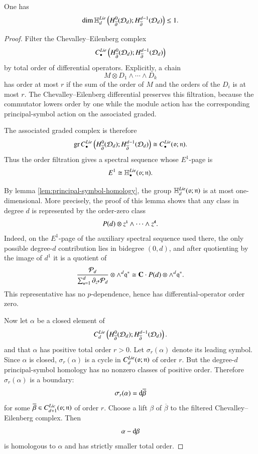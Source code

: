 \documentclass[main.tex]{subfiles}
\begin{document}
\begin{lemma}\label{lem:D-homology}
  One has
  \[
    \dim
    \mathbb H^{Lie}_d
    \left(
      H^0_{\overline{\partial}}(\mathcal D_d);
      H^{d-1}_{\overline{\partial}}(\mathcal D_d)
    \right)
    \leq 1.
  \]
\end{lemma}

\begin{proof}
Filter the Chevalley--Eilenberg complex
\[
  C^{Lie}_\bullet
  \left(
    H^0_{\overline{\partial}}(\mathcal D_d);
    H^{d-1}_{\overline{\partial}}(\mathcal D_d)
  \right)
\]
by total order of differential operators. Explicitly, a chain
\[
  M\otimes D_1\wedge\cdots\wedge D_k
\]
has order at most $r$ if the sum of the order of $M$ and the orders of the $D_i$ is at most $r$. The Chevalley--Eilenberg differential preserves this filtration, because the commutator lowers order by one while the module action has the corresponding principal-symbol action on the associated graded.

The associated graded complex is therefore
\[
  \operatorname{gr} C^{Lie}_\bullet
  \left(
    H^0_{\overline{\partial}}(\mathcal D_d);
    H^{d-1}_{\overline{\partial}}(\mathcal D_d)
  \right)
  \cong
  C^{Lie}_\bullet(\mathfrak{o};\mathfrak{n}).
\]
Thus the order filtration gives a spectral sequence whose $E^1$-page is
\[
  E^1
  \cong
  \mathbb H^{Lie}_\bullet(\mathfrak{o};\mathfrak{n}).
\]

By lemma \ref{lem:principal-symbol-homology}, the group $\mathbb H^{Lie}_d(\mathfrak{o};\mathfrak{n})$ is at most one-dimensional. More
precisely, the proof of this lemma shows that any class in degree $d$ is represented by the order-zero class
\[
  P(d)\otimes z^{\textbf{\texttt{\tiny{1}}}}\wedge\cdots\wedge z^{\textbf{\texttt{\tiny{d}}}} .
\]
Indeed, on the $E^1$-page of the auxiliary spectral sequence used there, the only possible degree-$d$ contribution lies in bidegree $(0,d)$, and after quotienting by the image of $d^1$ it is a quotient of
\[
  \frac{\mathcal P_d}{\sum_{\textbf{\texttt{\tiny{s}}}=1}^d \partial_{z^{\textbf{\texttt{\tiny{s}}}}}\mathcal P_d}
  \otimes \wedge^d\mathfrak{q}^*
  \cong
  \mathbf{C}\cdot P(d)\otimes \wedge^d\mathfrak{q}^*.
\]
This representative has no $p$-dependence, hence has differential-operator order zero.

Now let $\alpha$ be a closed element of
\[
  C^{Lie}_d
  \left(
    H^0_{\overline{\partial}}(\mathcal D_d);
    H^{d-1}_{\overline{\partial}}(\mathcal D_d)
  \right).
\]
and that $\alpha$ has positive total order $r>0$.
Let $\sigma_r(\alpha)$ denote its leading symbol. 
Since $\alpha$ is closed, $\sigma_r(\alpha)$ is a cycle in $C^{Lie}_d(\mathfrak{o};\mathfrak{n})$ of order $r$. 
But the degree-$d$ principal-symbol homology has no nonzero classes of positive order. 
Therefore $\sigma_r(\alpha)$ is a boundary:
\[
  \sigma_r(\alpha)=\mathrm{d} \overline{\beta}
\]
for some $\overline{\beta}\in C^{Lie}_{d+1}(\mathfrak{o};\mathfrak{n})$ of order $r$. Choose a lift $\beta$ of $\overline{\beta}$ to the filtered Chevalley--Eilenberg complex. 
Then
\[
  \alpha-\mathrm{d} \beta
\]
is homologous to $\alpha$ and has strictly smaller total order.


\end{proof}
\end{document}
